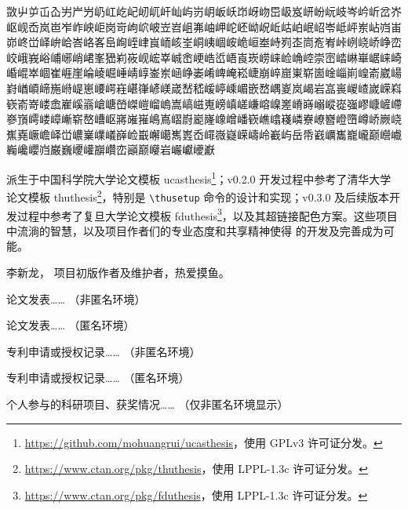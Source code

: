 \documentclass[master]{shtthesis}
\makeatletter
\def\ifgraduate{\ifsht@graduate}
\makeatother
\begin{document}
{\fangsong 敳屮屰屲屳屴屵屶屷屸屹屺屻屼屽屾屿岃岄岅岆岇岈岉岊岋岌岍岎岏岐岑岒岓岔岕岖岘岙岚岜岝岞岟岠岗岢岣岤岥岦岧岨岪岫岬岮岯岰岲岴岵岶岷岹岺岻岼岽岾岿峀峁峂峃峄峅峆峇峈峉峊峋峌峍峎峏峐峑峒峓崓峖峗峘峚峙峛峜峝峞峟峠峢峣峤峥峦峧峨峩峪峬峫峭峮峯峱峲峳岘峵峷峸峹峺峼峾峿崀崁崂崃崄崅崆崇崈崉崊崋崌崃崎崏崐崒崓崔崕崖崘崚崛崜崝崞崟岽崡峥崣崤崥崦崧崨崩崪崫崬崭崮崯崰崱崲嵛崴崵崶崷崸崹崺崻崼崽崾崿嵀嵁嵂嵃嵄嵅嵆嵇嵈嵉嵊嵋嵌嵍嵎嵏岚嵑岩嵓嵔嵕嵖嵗嵘嵙嵚嵛嵜嵝嵞嵟嵠嵡嵢嵣嵤嵥嵦嵧嵨嵩嵪嵫嵬嵭嵮嵯嵰嵱嵲嵳嵴嵵嵶嵷嵸嵹嵺嵻嵼嵽嵾嵿嶀嵝嶂嶃崭嶅嶆岖嶈嶉嶊嶋嶌嶍嶎嶏嶐嶑嶒嶓嵚嶕嶖嶘嶙嶚嶛嶜嶝嶞嶟峤嶡峣嶣嶤嶥嶦峄峃嶩嶪嶫嶬嶭崄嶯嶰嶱嶲嶳岙嶵嶶嶷嵘嶹岭嶻屿岳帋巀巁巂巃巄巅巆巇巈巉巊岿巌巍巎巏巐巑峦巓巅巕岩巗巘巙巚}

\backmatter
\begin{acknowledgement}
\shtthesis{} 派生于中国科学院大学论文模板 \textsf{ucasthesis}\footnote{\url{https://github.com/mohuangrui/ucasthesis}，使用 GPLv3 许可证分发。}；v0.2.0 开发过程中参考了清华大学论文模板 \textsf{thuthesis}\footnote{\url{https://www.ctan.org/pkg/thuthesis}，使用 LPPL-1.3c 许可证分发。}，特别是 \verb|\thusetup| 命令的设计和实现；v0.3.0 及后续版本开发过程中参考了复旦大学论文模板 \textsf{fduthesis}\footnote{\url{https://www.ctan.org/pkg/fduthesis}，使用 LPPL-1.3c 许可证分发。}，以及其超链接配色方案。这些项目中流淌的智慧，以及项目作者们的专业态度和共享精神使得 \shtthesis{} 的开发及完善成为可能。
\end{acknowledgement}

\ifgraduate
\begin{resume}
  李新龙，\shtthesis{} 项目初版作者及维护者，热爱摸鱼。
\end{resume}

\begin{publications}
  论文发表…… （非匿名环境）
\end{publications}

\begin{publications*}
  论文发表…… （匿名环境）
\end{publications*}

\begin{patents}
  专利申请或授权记录…… （非匿名环境）
\end{patents}

\begin{patents*}
  专利申请或授权记录…… （匿名环境）
\end{patents*}

\begin{projects}
  个人参与的科研项目、获奖情况…… （仅非匿名环境显示）
\end{projects}
\fi
\end{document}
